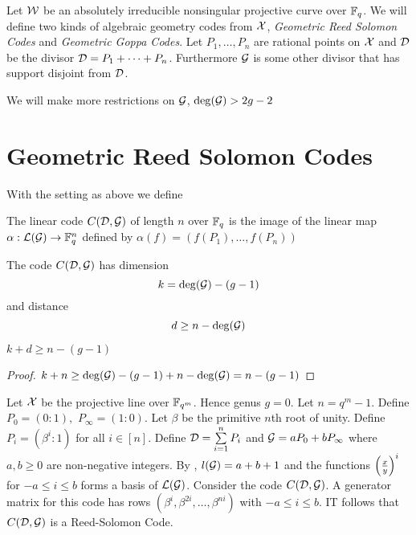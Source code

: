 Let $\mathcal{W}$ be an absolutely irreducible nonsingular projective curve over $\mathbb{F}_q$. We will define two kinds of algebraic geometry codes from $\mathcal{X}$, \textit{Geometric Reed Solomon Codes} and \textit{Geometric Goppa Codes}. Let $P_1,\dots, P_n$ are rational points on $\mathcal{X}$ and $\mathcal{D}$ be the divisor $\mathcal{D}=P_1+\dots +P_n$. Furthermore $\mathcal{G}$ is some other divisor that has support disjoint from $\mathcal{D}$. 

\begin{remark}
	We will make more restrictions on $\mathcal{G}$, $\deg(\mathcal{G})>2g-2$
\end{remark}
\section{Geometric Reed Solomon Codes}
With the setting as above we define 
\begin{definition}
	The linear code $C(\mathcal{D},\mathcal{G})$ of length $n$ over $\mathbb{F}_q$ is the image of the linear map $\alpha:\mathcal{L}(\mathcal{G})\to \mathbb{F}_q^n$ defined by $\alpha(f)=(f(P_1),\dots, f(P_n))$
\end{definition}
\begin{theorem}
	The code $C(\mathcal{D},\mathcal{G})$ has dimension $$k=\deg(\mathcal{G})-(g-1)$$ and distance $$d\geq n-\deg(\mathcal{G})$$
\end{theorem}
\begin{corollary}
	$k+d\geq n-(g-1)$ 
\end{corollary}
\begin{proof}
	$k+n\geq \deg(\mathcal{G})-(g-1) +  n-\deg(\mathcal{G})=n-(g-1)$
\end{proof}
\begin{example}
	Let $\mathcal{X}$ be the projective line over $\mathbb{F}_{q^m}$. Hence genus $g=0$. Let $n=q^m-1$.  Define $P_0=(0:1),$ $ P_{\infty}=(1:0)$. Let $\beta$ be the primitive $n$th root of unity. Define $P_i=(\beta^i:1)$ for all $i\in [n]$. Define $\mathcal{D}=\sum\limits_{i=1}^nP_i$ and $\mathcal{G}=aP_0+bP_{\infty}$ where $a,b\geq 0$ are non-negative integers. By , $l(\mathcal{G})=a+b+1$ and the functions $\left(\frac{x}{y}\right)^i$ for $-a\leq i\leq b$ forms a basis of $\mathcal{L}(\mathcal{G})$. Consider the code $C(\mathcal{D},\mathcal{G})$. A generator matrix for this code has rows $(\beta^i,\beta^{2i},\dots, \beta^{ni})$ with $-a\leq i\leq b$. IT follows that $C(\mathcal{D},\mathcal{G})$ is a Reed-Solomon Code. 
\end{example}

